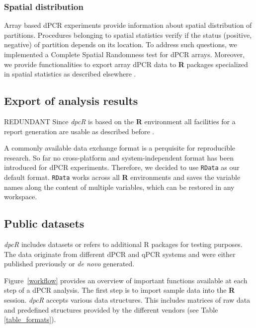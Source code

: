 \documentclass[a4,center,fleqn]{NAR}
\begin{document}
\subsubsection{Spatial distribution}

Array based dPCR experiments provide information about spatial distribution of 
partitions. Procedures belonging to spatial statistics verify if the status 
(positive, negative) of partition depends on its location. To address such 
questions, we implemented a Complete Spatial Randomness test for dPCR arrays. 
Moreover, we provide functionalities to export array dPCR data to \textbf{R} 
packages specialized in spatial statistics as described elsewhere 
\cite{Baddeley_2015}.


\subsection{Export of analysis results}
REDUNDANT
Since \textit{dpcR} is based on the \textbf{R} environment all facilities for a 
report generation are usable as described before \cite{rodiger_r_2015}.

A commonly available data exchange format is a perquisite for reproducible 
research. So far no cross-platform and system-independent format has been 
introduced for dPCR experiments. Therefore, we decided to use \texttt{RData} as 
our default format. \texttt{RData} works across all \textbf{R} environments and 
saves the variable names along the content of multiple variables, which can be 
restored in any workspace.


\subsection{Public datasets}

\textit{dpcR} includes datasets or refers to additional R packages for testing 
purposes. The data originate from different dPCR and qPCR systems and were 
either published previously \cite{whale_comparison_2012, roediger2015chippcr, 
white_digital_2009, rodiger_r_2015, dorazio_statistical_2015} or \textit{de 
novo} generated.

Figure~\ref{workflow} provides an overview of important functions available at 
each step of a dPCR analysis. The first step is to import sample data into the 
\textbf{R} session. \textit{dpcR} accepts various data structures. This 
includes 
matrices of raw data and predefined structures provided by the different 
vendors 
(see Table \ref{table_formats}). 
\end{document}
